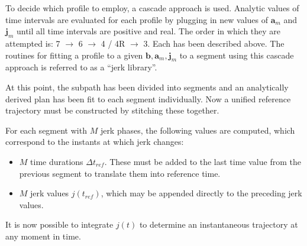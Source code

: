 \documentclass[letterpaper, 10 pt, conference]{ieeeconf}  %
\begin{document}
To decide which profile to employ, a cascade approach is used.
Analytic values of time intervals are evaluated for each profile by plugging in new values of $\mathbf{a}_m$ and $\mathbf{j}_m$ until all time intervals are positive and real.
The order in which they are attempted is: 7 $\rightarrow$ 6 $\rightarrow$ 4 / 4R $\rightarrow$ 3.
Each has been described above.
The routines for fitting a profile to a given $\mathbf{b}, \mathbf{a}_m, \mathbf{j}_m$ to a segment using this cascade approach is referred to as a ``jerk library''.

At this point, the subpath has been divided into segments and an analytically derived plan has been fit to each segment individually.
Now a unified reference trajectory must be constructed by stitching these together.

For each segment with $M$ jerk phases, the following values are computed, which correspond to the instants at which jerk changes:
\begin{itemize}
  \item $M$ time durations $\Delta t_{ref}$. These must be added to the last time value from the previous segment to translate them into reference time.
  \item $M$ jerk values $j(t_{ref})$, which may be appended directly to the preceding jerk values.
\end{itemize}
It is now possible to integrate $j(t)$ to determine an instantaneous trajectory at any moment in time.


\end{document}
